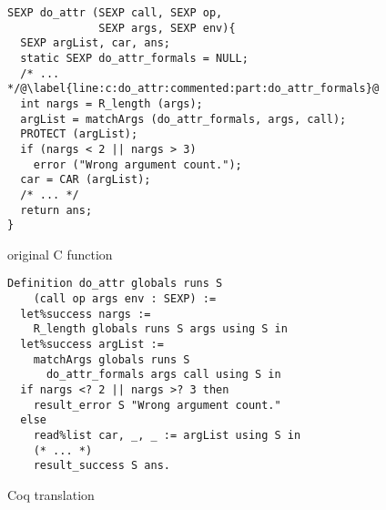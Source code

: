 \documentclass[
    sigplan,
    10pt,
    review, %
    natbib=false %
 ]{acmart}
\newcommand\CoqR{CoqR}
\begin{document}

\begin{figure*}[t]
    \centering{}
\begin{subfigure}{.54\textwidth}
    \begin{verbatim}
SEXP do_attr (SEXP call, SEXP op,
              SEXP args, SEXP env){
  SEXP argList, car, ans;
  static SEXP do_attr_formals = NULL;
  /* ... */@\label{line:c:do_attr:commented:part:do_attr_formals}@
  int nargs = R_length (args);
  argList = matchArgs (do_attr_formals, args, call);
  PROTECT (argList);
  if (nargs < 2 || nargs > 3)
    error ("Wrong argument count.");
  car = CAR (argList);
  /* ... */
  return ans;
}
\end{verbatim}
\vspace{-1em}
    \caption{original C function}
    \label{fig:c:do_attr}
\end{subfigure}
\begin{subfigure}{.45\textwidth}
\begin{verbatim}
Definition do_attr globals runs S
    (call op args env : SEXP) :=
  let%success nargs :=
    R_length globals runs S args using S in
  let%success argList :=
    matchArgs globals runs S
      do_attr_formals args call using S in
  if nargs <? 2 || nargs >? 3 then
    result_error S "Wrong argument count."
  else
    read%list car, _, _ := argList using S in
    (* ... *)
    result_success S ans.
\end{verbatim}
\vspace{-.6em}
    \caption{Coq translation}
    \label{fig:coq:do_attr}
\end{subfigure}
\vspace{-1em}
    \caption{Original C function and Coq translation of \texttt{do_attr}}
    \label{fig:do_attr}
\end{figure*}
\end{document}
